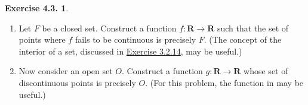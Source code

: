 \documentclass[12pt]{article}
\theoremstyle{definition}
\theoremstyle{exercise}
\newtheorem{exercise}{Exercise 4.3.}
\theoremstyle{solution}
\newcommand{\R}{\mathbf{R}}
\begin{document}
\begin{exercise}
\label{ex:14}
    \begin{enumerate}
        \item Let \( F \) be a closed set. Construct a function \( f : \R \to \R \) such that the set of points where \( f \) fails to be continuous is precisely \( F \). (The concept of the interior of a set, discussed in \href{https://lew98.github.io/Mathematics/UA_Section_3_2_Exercises.pdf}{Exercise 3.2.14}, may be useful.)

        \item Now consider an open set \( O \). Construct a function \( g : \R \to \R \) whose set of discontinuous points is precisely \( O \). (For this problem, the function in  may be useful.)
    \end{enumerate}
\end{exercise}
\end{document}
